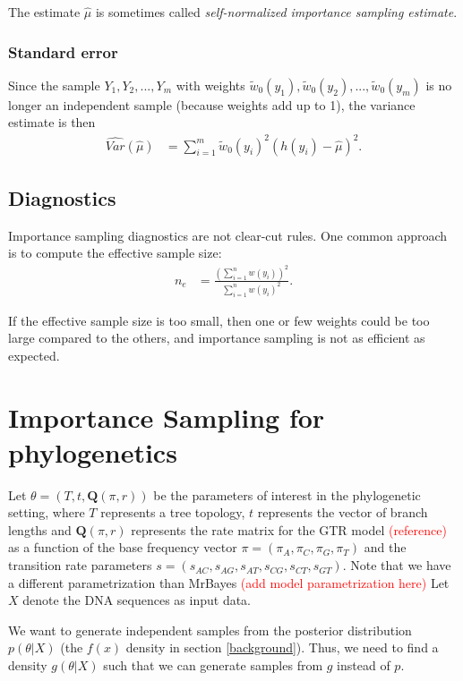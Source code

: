\documentclass[conference]{IEEEtran}
\newcommand{\falta}[1]{\textcolor{red}{#1}}
\begin{document}
The estimate $\hat{\mu}$ is sometimes called
\textit{self-normalized importance sampling estimate}.

\subsubsection*{Standard error}
Since the sample $Y_1,Y_2,...,Y_m$ with weights
$\tilde{w}_0(y_1),\tilde{w}_0(y_2),...,\tilde{w}_0(y_m)$ is no longer
an independent sample (because weights add up to 1), the variance
estimate is then \citep{Owen2013}
\begin{align*}
\widehat{Var}(\hat{\mu}) &= \sum_{i=1}^m \tilde{w}_0(y_i)^2(h(y_i)-\hat{\mu})^2.
\end{align*}

\subsection*{Diagnostics}
Importance sampling diagnostics are not clear-cut rules. One common
approach is to compute the effective sample size:
\begin{align*}
n_e &= \frac{\left( \sum_{i=1}^n w(y_i) \right)^2}{\sum_{i=1}^nw(y_i)^2}.
\end{align*}

If the effective sample size is too small, then one or few weights
could be too large compared to the others, and importance sampling is
not as efficient as expected.

\section{Importance Sampling for phylogenetics}
\label{phyloIS}

Let $\theta = (T, t, \mathbf{Q}(\pi,r))$ be the parameters of interest
in the phylogenetic setting, where $T$ represents a tree topology,
$t$ represents the vector of branch lengths and $\mathbf{Q}(\pi,r)$
represents the rate matrix for the GTR model \falta{(reference)} as a
function of the base frequency vector $\pi = (\pi_A, \pi_C, \pi_G,
\pi_T)$ and the transition rate parameters $s = (s_{AC}, s_{AG},
s_{AT}, s_{CG}, s_{CT}, s_{GT})$. Note that we have a different
parametrization than MrBayes \falta{(add model parametrization here)}
Let $X$ denote the DNA sequences as input data.

We want to generate independent samples from the posterior
distribution $p(\theta|X)$ (the $f(x)$ density in section
\ref{background}). Thus, we need to find a density $g(\theta|X)$ such
that we can generate samples from $g$ instead of $p$.
\end{document}
